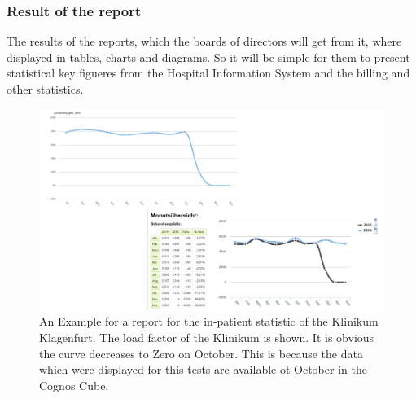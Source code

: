 \documentclass[a4paper]{article}
\begin{document}
	\subsubsection{Result of the report}
	The results of the reports, which the boards of directors will get from it,
	where displayed in tables, charts and diagrams. So it will be simple for them
	to present statistical key figueres from the Hospital Information System and the
	billing and other statistics.
	\begin{figure}[!ht]
		  \centering
		      \includegraphics[width=1.0\textwidth]{reports_results}
		  \caption{An Example for a report for the in-patient statistic of the
		  Klinikum Klagenfurt. The load factor of the Klinikum is shown. It is
		  obvious the curve decreases to Zero on October. This is because the data
		  which were displayed for this tests are available ot October in the Cognos
		  Cube.}
	\end{figure}
\end{document}
